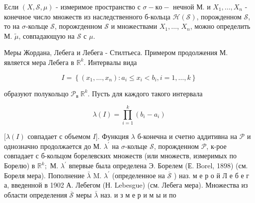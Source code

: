 \documentclass[10pt]{article}
\begin{document}
Если $(X, \mathscr{S}, \mu)$ - измеримое пространство с $\sigma-к о-$ нечной М. и $X_{1}, \ldots, X_{n}$ - конечное число множеств из наследственного б-кольца $\mathscr{H}(\mathscr{S})$, порожденном $\mathscr{S}$, то на $\sigma$-кольце $\mathscr{S}$, порожгденном $\mathscr{S}$ и множествами $X_{1}, \ldots$, $X_{n}$, можно определить М. $\tilde{\mu}$, совпадающую на $\mathscr{S}$ с $\mu$.



Меры Жордана, Лебега и Лебега - Стилтьеса. Примером продолжения М. является мера Лебега в $\mathbb{R}^{k}$. Интервалы вида



\[

I=\left\{\left(x_{1}, \ldots, x_{n}\right): a_{i} \leqslant x_{i}<b_{i}, i=1, \ldots, k\right\}

\]



образуют полукольцо $\mathscr{P}_{\text {в }} \mathbb{R}^{k}$. Пусть для каждого такого интервала



\[

\lambda(I)=\prod_{i=1}^{k}\left(b_{i}-a_{i}\right)

\]



$[\lambda(I)$ совпадает с объемом $I]$. Функция $\lambda$ б-конечна и счетно аддитивна на $\mathscr{P}$ и однозначно продолжается до М. $\lambda^{\prime}$ на $\sigma$-кольце $\mathscr{S}$, порожденном $\mathscr{P}$, к-рое совпадает с б-кольцом борелевских множеств (или множеств, измеримых по Борелю) в $\mathbb{R}^{k} ;$ М. $\lambda^{\prime}$ впервые была определена Э. Борелем (Е. Borel, 1898) (см. Бореля мера). Пополнение $\bar{\lambda}$ M. $\lambda^{\prime}$ (определенное на $\overline{\mathscr{S}}$ ) наз. м е р о й Л е б е г а, введенной в 1902 А. Лебегом (Н. Lebesgue) (см. Лебега мера). Множества из области определения $\overline{\mathscr{S}}$ меры $\bar{\lambda}$ наз. и з м е р и м ы и по
\end{document}
